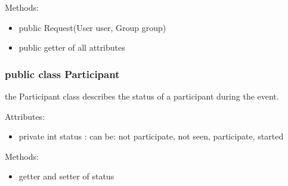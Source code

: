 	Methods: 
	\begin{itemize}
	\item public Request(User user, Group group)
	\item public getter of all attributes
	\end{itemize}
	


\subsubsection {public class Participant} 
 the Participant class describes the status of a participant during the event.

Attributes:
\begin{itemize}
\item	private int status : can be: not participate, not seen, participate, started
\end{itemize}

	Methods: 
	\begin{itemize}
	\item getter and setter of status
	\end{itemize}

	
